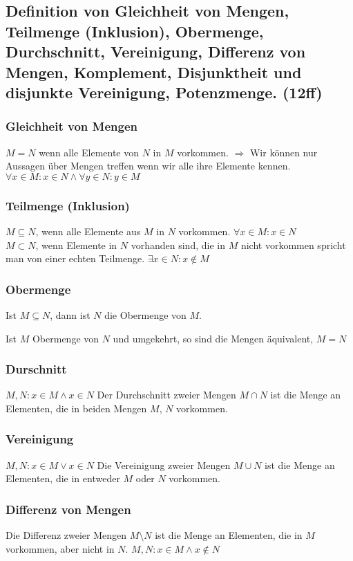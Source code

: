 \documentclass[10pt,a4paper]{article}
\begin{document}
\subsection{Definition von Gleichheit von Mengen, Teilmenge (Inklusion), Obermenge, Durchschnitt, Vereinigung, Differenz von Mengen, Komplement, Disjunktheit und disjunkte Vereinigung, Potenzmenge. (12ff)}
\subsubsection{Gleichheit von Mengen}
$M = N$ wenn alle Elemente von $N$ in $M$ vorkommen. $\Rightarrow$ Wir können nur Aussagen über Mengen treffen wenn wir alle ihre Elemente kennen. $\forall x \in M: x \in N \wedge \forall y \in N: y \in M$
\subsubsection{Teilmenge (Inklusion)}
$M \subseteq N$, wenn alle Elemente aus $M$ in $N$ vorkommen. $\forall x \in M: x \in N$ \\
$M \subset N$, wenn Elemente in $N$ vorhanden sind, die in $M$ nicht vorkommen spricht man von einer echten Teilmenge. $\exists x \in N: x \notin M$

\subsubsection{Obermenge}
Ist $M \subseteq N$, dann ist $N$ die Obermenge von $M$.

Ist $M$ Obermenge von $N$ und umgekehrt, so sind die Mengen äquivalent, $M = N$

\subsubsection{Durschnitt}
$M,N : x \in M \wedge x \in N$
Der Durchschnitt zweier Mengen $M \cap N$ ist die Menge an Elementen, die in beiden Mengen $M$, $N$ vorkommen.

\subsubsection{Vereinigung}
$M,N: x \in M \vee x \in N$
Die Vereinigung zweier Mengen $M \cup N$ ist die Menge an Elementen, die in entweder $M$ oder $N$ vorkommen.

\subsubsection{Differenz von Mengen}
Die Differenz zweier Mengen $M\setminus N$ ist die Menge an Elementen, die in $M$ vorkommen, aber nicht in $N$.
$M,N : x \in M \wedge x \notin N$
\end{document}
